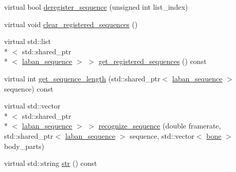 \begin{DoxyCompactItemize}
virtual bool \hyperlink{classmae_1_1fl_1_1laban_1_1laban__sequence__recognizer_ac3fb568e668228472ea3a1ff0124898e}{deregister\-\_\-sequence} (unsigned int list\-\_\-index)
\item 
virtual void \hyperlink{classmae_1_1fl_1_1laban_1_1laban__sequence__recognizer_a4eaa30d1cd8064e381765a2b3385a248}{clear\-\_\-registered\-\_\-sequences} ()
\item 
virtual std\-::list\\*
$<$ std\-::shared\-\_\-ptr\\*
$<$ \hyperlink{classmae_1_1fl_1_1laban_1_1laban__sequence}{laban\-\_\-sequence} $>$ $>$ \hyperlink{classmae_1_1fl_1_1laban_1_1laban__sequence__recognizer_a5943813eff1aa8d316c0b2e4b3447a78}{get\-\_\-registered\-\_\-sequences} () const 
\item 
virtual int \hyperlink{classmae_1_1fl_1_1laban_1_1laban__sequence__recognizer_a3ef80c6bdb2f7478a6940d74cbfb33cb}{get\-\_\-sequence\-\_\-length} (std\-::shared\-\_\-ptr$<$ \hyperlink{classmae_1_1fl_1_1laban_1_1laban__sequence}{laban\-\_\-sequence} $>$ sequence) const 
\item 
virtual std\-::vector\\*
$<$ std\-::shared\-\_\-ptr\\*
$<$ \hyperlink{classmae_1_1fl_1_1laban_1_1laban__sequence}{laban\-\_\-sequence} $>$ $>$ \hyperlink{classmae_1_1fl_1_1laban_1_1laban__sequence__recognizer_a585dc721196e18e76e396d16f609d072}{recognize\-\_\-sequence} (double framerate, std\-::shared\-\_\-ptr$<$ \hyperlink{classmae_1_1fl_1_1laban_1_1laban__sequence}{laban\-\_\-sequence} $>$ sequence, std\-::vector$<$ \hyperlink{classmae_1_1bone}{bone} $>$ body\-\_\-parts)
\item 
virtual std\-::string \hyperlink{classmae_1_1fl_1_1laban_1_1laban__sequence__recognizer_af411c388147b6945827ab7fdd47ce131}{str} () const 
\end{DoxyCompactItemize}



